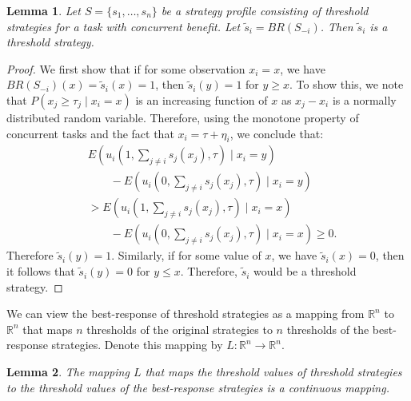 \documentclass[12pt]{article}
\newtheorem{lemma}{Lemma}
\def\R{\mathbb{R}}    %
\begin{document}
\begin{lemma}
Let $S=\{s_1,\ldots,s_n\}$ be a strategy profile consisting of threshold strategies for a task with  concurrent benefit. Let $\tilde{s}_i=BR(S_{-i})$. Then $\tilde{s}_i$ is a threshold strategy. 
\end{lemma} 

\begin{proof}
We first show that if for some observation $x_i=x$, we have $BR(S_{-i})(x)=\tilde{s}_i(x)=1$, then $\tilde{s}_i(y)=1$ for $y\geq x$. To show this,  we note that $P(x_j\geq \tau_j\mid x_i=x)$ is an increasing function of $x$ as $x_j-x_i$ is a normally distributed random variable. Therefore, using the monotone property of concurrent tasks and the fact that $x_i=\tau+\eta_i$, we conclude that:
\vspace{-5px}
\begin{align*}
&E(u_i(1,\sum_{j\not=i}s_j(x_j),\tau)\mid x_i=y)\\ 
&\qquad-E(u_i(0,\sum_{j\not=i}s_j(x_j),\tau)\mid x_i=y)\\ 
&>E(u_i(1,\sum_{j\not=i}s_j(x_j),\tau)\mid x_i=x)\\
&\qquad-E(u_i(0,\sum_{j\not=i}s_j(x_j),\tau)\mid x_i=x)\geq 0.
\end{align*}
Therefore $\tilde{s}_i(y)=1$. Similarly, if for some value of $x$, we have $\tilde{s}_i(x)=0$, then it follows that $\tilde{s}_i(y)=0$ for $y\leq x$. Therefore, $\tilde{s}_i$ would be a threshold strategy.  
\end{proof}

We can view the best-response of threshold strategies as a mapping from $\R^n$ to $\R^n$ that maps $n$ thresholds of the original strategies to $n$ thresholds of the best-response strategies. Denote this mapping by $L:\R^n\to\R^n$.
\begin{lemma}\label{lemma:continuous}
The mapping $L$ that maps the threshold values of threshold strategies to the threshold values of the best-response strategies is a continuous mapping. 
\end{lemma}
\end{document}
